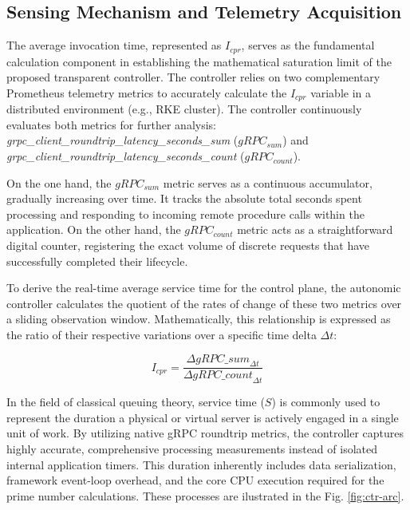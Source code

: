 \documentclass{ieeeaccess}
\begin{document}
	
	\subsection{Sensing Mechanism and Telemetry Acquisition}
	\label{sec3.1}
	The average invocation time, represented as $I_{cpr}$, serves as the fundamental calculation component in establishing the mathematical saturation limit of the proposed transparent controller. The controller relies on two complementary Prometheus telemetry metrics to accurately calculate the $I_{cpr}$ variable in a distributed environment (e.g., RKE cluster). The controller continuously evaluates both metrics for further analysis: \textit{grpc\_client\_roundtrip\_latency\_seconds\_sum} ($gRPC_{sum}$) and \textit{grpc\_client\_roundtrip\_latency\_seconds\_count} ($gRPC_{count}$).
	
	On the one hand, the $gRPC_{sum}$ metric serves as a continuous accumulator, gradually increasing over time. It tracks the absolute total seconds spent processing and responding to incoming remote procedure calls within the application. On the other hand, the $gRPC_{count}$ metric acts as a straightforward digital counter, registering the exact volume of discrete requests that have successfully completed their lifecycle. 
	
	To derive the real-time average service time for the control plane, the autonomic controller calculates the quotient of the rates of change of these two metrics over a sliding observation window. Mathematically, this relationship is expressed as the ratio of their respective variations over a specific time delta $\Delta t$:
	
	\begin{equation}
		I_{cpr} = \frac{\Delta \textit{gRPC_{sum}}_{\Delta t}}{\Delta \textit{gRPC_{count}}_{\Delta t}}
	\end{equation}
	
	In the field of classical queuing theory, service time ($S$) is commonly used to represent the duration a physical or virtual server is actively engaged in a single unit of work. By utilizing native gRPC roundtrip metrics, the controller captures highly accurate, comprehensive processing measurements instead of isolated internal application timers. This duration inherently includes data serialization, framework event-loop overhead, and the core CPU execution required for the prime number calculations. These processes are ilustrated in the Fig. \ref{fig:ctr-arc}. 
	
	
	
\end{document}
